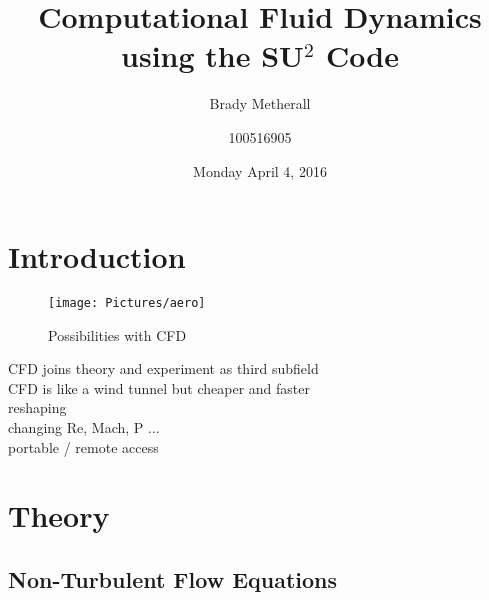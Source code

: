 \documentclass[10pt, titlepage]{article}
\title{Computational Fluid Dynamics \\ \large using the SU$^2$ Code}
\author{Brady Metherall \and 100516905}
\date{Monday April 4, 2016}
\begin{document}
\maketitle
\setlength\parindent{0pt}
\lstset{language=myMMA}

\listoffigures

\listoftables

\section{Introduction}

\begin{wrapfigure}{R}{0.45\textwidth}
\centering
\texttt{[image: Pictures/aero]}
\caption[Possibilities with CFD]{Possibilities with CFD \cite{aeroplane}}
\label{fig:aeroplane}
\end{wrapfigure}

CFD joins theory and experiment as third subfield \\
CFD is like a wind tunnel but cheaper and faster \\
reshaping \\
changing Re, Mach, P ... \\
portable / remote access \\

\lipsum[1-2]
\newpage

\section{Theory}
\subsection{Non-Turbulent Flow Equations}
\end{document}
